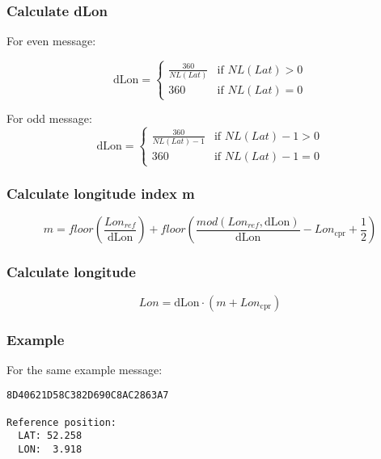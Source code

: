 \subsubsection{Calculate dLon}\label{calculate-dlon}

For even message:

\begin{equation}
  \mathrm{dLon} =
  \begin{cases}
   \frac{360}{NL(Lat)}    & \text{if } NL(Lat) > 0  \\
   360                    & \text{if } NL(Lat) = 0
  \end{cases}
\end{equation}

For odd message:
\begin{equation}
  \mathrm{dLon} =
  \begin{cases}
   \frac{360}{NL(Lat)-1}    & \text{if } NL(Lat) - 1 > 0  \\
   360                    & \text{if } NL(Lat) - 1 = 0
  \end{cases}
\end{equation}


\subsubsection{Calculate longitude index
m}\label{calculate-longitude-index-m}

\begin{equation}
  m = floor \left( \frac{Lon_{ref}}{\mathrm{dLon}} \right) + floor \left( \frac{mod(Lon_{ref}, \mathrm{dLon})}{\mathrm{dLon}}  - Lon_\mathrm{cpr}  + \frac{1}{2}  \right)
\end{equation}

\subsubsection{Calculate longitude}\label{calculate-longitude-1}

\begin{equation}
  Lon = \mathrm{dLon} \cdot (m + Lon_\mathrm{cpr})
\end{equation}

\subsubsection{Example}\label{example}

For the same example message:

\begin{verbatim}
8D40621D58C382D690C8AC2863A7

Reference position:
  LAT: 52.258
  LON:  3.918
\end{verbatim}

